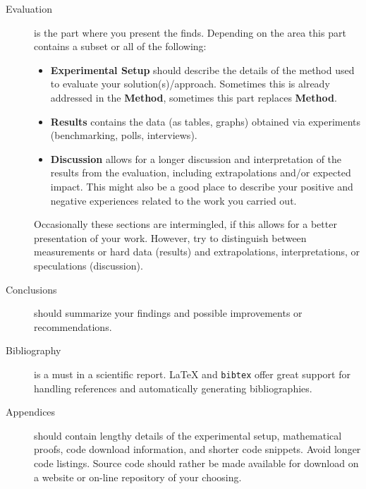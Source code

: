 \documentclass{cslthse-msc}
\begin{document}
\begin{description}
\begin{itemize}
\end{itemize}
\item[Evaluation] is the part where you present the finds. Depending on the area this part contains a subset or all of the following: 
\begin{itemize}
\item \textbf{Experimental Setup} should describe the details of the method used to evaluate your solution(s)/approach. Sometimes this is already addressed in the \textbf{Method}, sometimes this part replaces \textbf{Method}.
\item \textbf{Results} contains the data (as tables, graphs) obtained via experiments  (benchmarking, polls, interviews).
\item \textbf{Discussion} allows for a longer discussion and interpretation of the results from the evaluation, including extrapolations and/or expected impact. This might also be a good place to describe your positive and negative experiences related to the work you carried out.
\end{itemize} 
Occasionally these sections are intermingled, if this allows for a better presentation of your work. However, try to distinguish between measurements or hard data (results) and extrapolations, interpretations, or speculations (discussion).
\item[Conclusions] should summarize your findings and possible improvements or recommendations.
\item[Bibliography] is a must in a scientific report. {\LaTeX} and \texttt{bibtex} offer great support for  handling references and automatically generating bibliographies.
\item[Appendices] should contain lengthy details of the experimental setup, mathematical proofs, code download information, and shorter code snippets. Avoid longer code listings. Source code should rather be made available for download on a website or on-line repository of your choosing.

\end{description}
\end{document}
